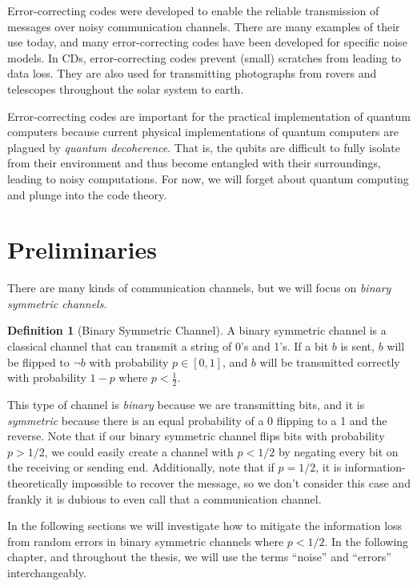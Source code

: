 \documentclass[12pt,twoside]{reedthesis}
\theoremstyle{definition}
\newtheorem{definition}[theorem]{Definition}
\begin{document}
Error-correcting codes were developed to enable the reliable transmission of messages over noisy communication channels. There are many examples of their use today, and many error-correcting codes have been developed for specific noise models. In CDs, error-correcting codes prevent (small) scratches from leading to data loss. They are also used for transmitting photographs from rovers and telescopes throughout the solar system to earth. 

Error-correcting codes are important for the practical implementation of quantum computers because current physical implementations of quantum computers are plagued by \textit{quantum decoherence}. That is, the qubits are difficult to fully isolate from their environment and thus become entangled with their surroundings, leading to noisy computations. For now, we will forget about quantum computing and plunge into the code theory.

\section{Preliminaries}
There are many kinds of communication channels, but we will focus on \textit{binary symmetric channels}. 

\begin{definition}[Binary Symmetric Channel] A binary symmetric channel is a classical channel that can transmit a string of 0's and 1's. If a bit $b$ is sent, $b$ will be flipped to $\lnot b$ with probability $p \in [0,1]$, and $b$ will be transmitted correctly with probability $1-p$ where $p < \frac{1}{2}$.
\end{definition}

This type of channel is \textit{binary} because we are transmitting bits, and it is \textit{symmetric} because there is an equal probability of a 0 flipping to a 1 and the reverse. Note that if our binary symmetric channel flips bits with probability $p > 1/2$, we could easily create a channel with $p <1/2$ by negating every bit on the receiving or sending end. Additionally, note that if $p=1/2$, it is  information-theoretically impossible to recover the message, so we don't consider this case and frankly it is dubious to even call that a communication channel.

In the following sections we will investigate how to mitigate the information loss from random errors in binary symmetric channels where $p<1/2$. In the following chapter, and throughout the thesis, we will use the terms ``noise'' and ``errors'' interchangeably.
\end{document}
